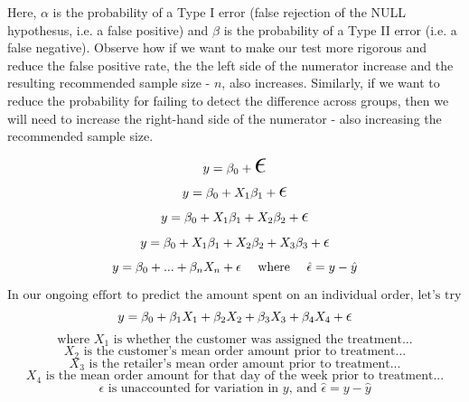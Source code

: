 \documentclass[12pt]{article}
\begin{document}
Here, $\alpha$ is the probability of a Type I error (false rejection of the NULL hypothesus, i.e. a false positive) and $\beta$ is the probability of a Type II error (i.e. a false negative). Observe how if we want to make our test more rigorous and reduce the false positive rate, the the left side of the numerator increase and the resulting recommended sample size - $n$, also increases. Similarly, if we want to reduce the probability for failing to detect the difference across groups, then we will need to increase the right-hand side of the numerator - also increasing the recommended sample size.

\newpage
\[ y = \beta_0 + \mathlarger{\mathlarger{\mathlarger{\mathlarger{\mathlarger{\mathlarger{\epsilon}}}}}} \]
\[ y = \beta_0 + X_1\beta_1 + \mathlarger{\mathlarger{\mathlarger{\epsilon}}}\]
\[ y = \beta_0 + X_1\beta_1 + X_2\beta_2 + \mathlarger{\mathlarger{\epsilon}}\]
\[ y = \beta_0 + X_1\beta_1 + X_2\beta_2 + X_3\beta_3 +\mathlarger{\epsilon}\]
\[ y = \beta_0 + ... + \beta_nX_n + \epsilon \text{\phantom{aa} where \phantom{aa}} \hat{\epsilon} = y - \hat{y}\]

\newpage
\[\text{In our ongoing effort to predict the amount spent on an individual order, let's try the following...}\]
\[ y = \beta_0 + \beta_1X_1 + \beta_2X_2 + \beta_3X_3 + \beta_4X_4 +\mathlarger{\epsilon}\]
\[\text{where } X_1 \text{ is whether the customer was assigned the treatment...}\]
\[X_2 \text{ is the customer's mean order amount prior to treatment...}\]
\[X_3 \text{ is the retailer's mean order amount prior to treatment...}\]
\[X_4 \text{ is the mean order amount for that day of the week prior to treatment...}\]
\[\epsilon \text{ is unaccounted for variation in $y$, and } \hat{\epsilon} = y - \hat{y}\]
\end{document}
